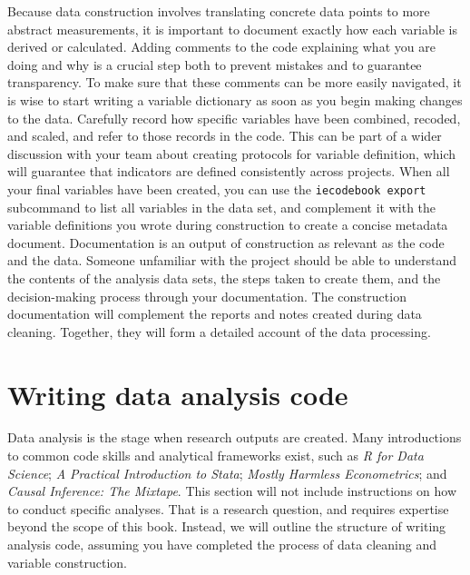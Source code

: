 Because data construction involves translating concrete data points to more abstract measurements,
it is important to document exactly how each variable is derived or calculated.
Adding comments to the code explaining what you are doing and why is a crucial step both to prevent mistakes and to guarantee transparency.
To make sure that these comments can be more easily navigated,
it is wise to start writing a variable dictionary as soon as you begin making changes to the data.
Carefully record how specific variables have been combined, recoded, and scaled,
and refer to those records in the code.
This can be part of a wider discussion with your team about creating protocols for variable definition,
which will guarantee that indicators are defined consistently across projects.
When all your final variables have been created,
you can use the \texttt{iecodebook export} subcommand to list all variables in the data set,
and complement it with the variable definitions you wrote during construction to create a concise metadata document.
Documentation is an output of construction as relevant as the code and the data.
Someone unfamiliar with the project should be able to understand the contents of the analysis data sets,
the steps taken to create them,
and the decision-making process through your documentation.
The construction documentation will complement the reports and notes created during data cleaning.
Together, they will form a detailed account of the data processing.


\section{Writing data analysis code}

Data analysis is the stage when research outputs are created.
Many introductions to common code skills and analytical frameworks exist, such as
\textit{R for Data Science};
\textit{A Practical Introduction to Stata};
\textit{Mostly Harmless Econometrics};
and \textit{Causal Inference: The Mixtape}.
This section will not include instructions on how to conduct specific analyses.
That is a research question, and requires expertise beyond the scope of this book.
Instead, we will outline the structure of writing analysis code,
assuming you have completed the process of data cleaning and variable construction.

